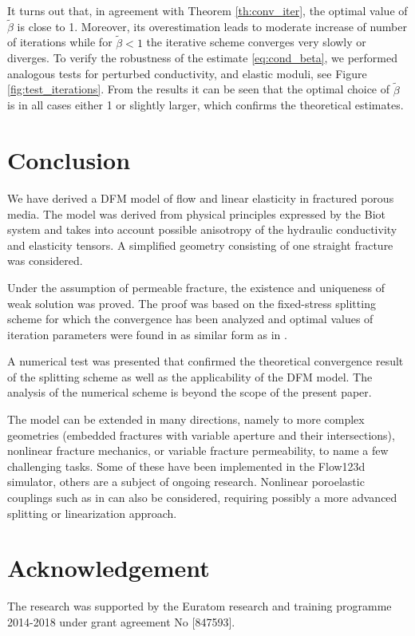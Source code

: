 \documentclass[a4paper]{article}
\numberwithin{equation}{section}
\def\js#1{{\color{blue}#1}}
\begin{document}
It turns out that, in agreement with Theorem \ref{th:conv_iter}, the optimal value of $\tilde\beta$ is close to 1.
Moreover, its overestimation leads to moderate increase of number of iterations while for $\tilde\beta<1$ the iterative scheme converges very slowly or diverges.
To verify the robustness of the estimate \eqref{eq:cond_beta}, we performed analogous tests for perturbed conductivity, and elastic moduli, see Figure \ref{fig:test_iterations}.
From the results it can be seen that the optimal choice of $\tilde\beta$ is in all cases either 1 or slightly larger, which confirms the theoretical estimates.


\section*{Conclusion}
We have derived a DFM model of flow and linear elasticity in fractured porous media.
The model was derived from physical principles expressed by the Biot system and takes into account possible anisotropy of the hydraulic conductivity and elasticity tensors.
A simplified geometry consisting of one straight fracture was considered.

Under the assumption of permeable fracture, the existence and uniqueness of weak solution was proved.
The proof was based on the fixed-stress splitting scheme for which the convergence has been analyzed and optimal values of iteration parameters were found in as similar form as in \cite{both2017robust}.

A numerical test was presented that confirmed the theoretical convergence result of the splitting scheme as well as the applicability of the DFM model.
The analysis of the numerical scheme is beyond the scope of the present paper.

The model can be extended in many directions, namely to more complex geometries (embedded fractures with variable aperture and their intersections), nonlinear fracture mechanics, %
or variable fracture permeability, %
to name a few challenging tasks.
Some of these have been implemented in the Flow123d simulator, others are a subject of ongoing research.
\js{Nonlinear poroelastic couplings such as in \cite{borregales2018robust,reveron2021iterative} can also be considered, requiring possibly a more advanced splitting or linearization approach.}


\section*{Acknowledgement}
The research was supported by the Euratom research and training programme 2014-2018 under grant agreement No [847593].
\end{document}
